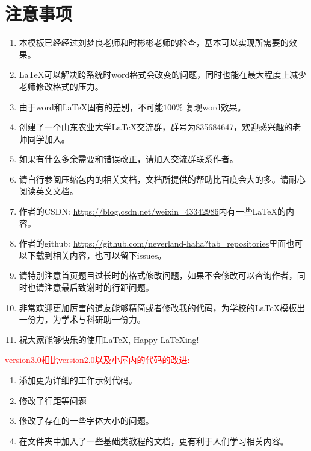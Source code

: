 \chapter{注意事项}

\begin{enumerate}
	\item 本模板已经经过刘梦良老师和时彬彬老师的检查，基本可以实现所需要的效果。
	\item \LaTeX 可以解决跨系统时word格式会改变的问题，同时也能在最大程度上减少老师修改格式的压力。
	\item 由于word和\LaTeX 固有的差别，不可能$100$\% 复现word效果。
	\item 创建了一个山东农业大学\LaTeX 交流群，群号为835684647，欢迎感兴趣的老师同学加入。
	\item 如果有什么多余需要和错误改正，请加入交流群联系作者。
	\item  请自行参阅压缩包内的相关文档，文档所提供的帮助比百度会大的多。请耐心阅读英文文档。
	\item 作者的CSDN: \href{https://blog.csdn.net/weixin_43342986}{https://blog.csdn.net/weixin\_43342986}内有一些\LaTeX 的内容。
	\item 作者的github: \href{https://github.com/neverland-haha?tab=repositories}{https://github.com/neverland-haha?tab=repositories}里面也可以下载到相关内容，也可以留下issues。
	\item 请特别注意首页题目过长时的格式修改问题，如果不会修改可以咨询作者，同时也请注意最后致谢时的行距问题。
	\item 非常欢迎更加厉害的道友能够精简或者修改我的代码，为学校的\LaTeX 模板出一份力，为学术与科研助一份力。
	\item 祝大家能够快乐的使用\LaTeX , Happy \LaTeX ing!
\end{enumerate}

\textcolor{red}{version3.0相比version2.0以及小屋内的代码的改进:}
\begin{enumerate}
	\item 添加更为详细的工作示例代码。
	\item 修改了行距等问题
	\item 修改了存在的一些字体大小的问题。
	\item 在文件夹中加入了一些基础类教程的文档，更有利于人们学习相关内容。
\end{enumerate}